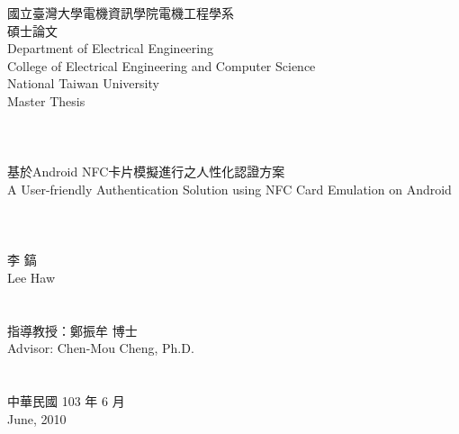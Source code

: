 \documentclass[12pt]{report}
\begin{document}
\onehalfspacing

\begin{titlepage}
\begin{center}

\begin{CJK}{UTF8}{bkai}
\Large{{國立臺灣大學電機資訊學院電機工程學系\\碩士論文}}\\
\large{{Department of Electrical Engineering}}\\
\large{College of Electrical Engineering and Computer Science}\\
\Large{{National Taiwan University}}\\
\Large{{Master Thesis}}\\

\hspace*{1cm}~\\
\hspace*{1cm}~\\
\hspace*{1cm}~\\
\Large{基於Android NFC卡片模擬進行之人性化認證方案\\
A User-friendly Authentication Solution using NFC Card Emulation on Android }\\
\hspace*{1cm}~\\
\hspace*{1cm}~\\
\hspace*{1cm}~\\

\Large{李  鎬\\Lee Haw}\\
\hspace*{1cm}~\\
\hspace*{1cm}~\\

\Large{指導教授：鄭振牟 博士\\Advisor: Chen-Mou Cheng, Ph.D.}\\
\hspace*{1cm}~\\
\hspace*{1cm}~\\


\Large{中華民國 103 年 6 月\\June, 2010}\\

\end{CJK}
\end{center}
\end{titlepage}
\end{document}
